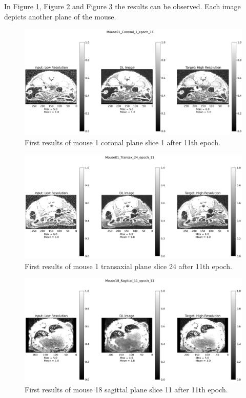 \documentclass[twocolumn]{article}
\begin{document}
In Figure \ref{fig:coronal_first}, Figure \ref{fig:transax_first} and Figure \ref{fig:sagittal_first} the results can be observed. 
Each image depicts another plane of the mouse.

\begin{figure}
    \centering
    \includegraphics[width=1\linewidth]{Mouse01_Coronal_1_epoch_11.png}
    \caption{First results of mouse 1 coronal plane slice 1 after 11th epoch.}
    \label{fig:coronal_first}
\end{figure}

\begin{figure}
    \centering
    \includegraphics[width=1\linewidth]{Mouse01_Transax_24_epoch_11.png}
    \caption{First results of mouse 1 transaxial plane slice 24 after 11th epoch.}
    \label{fig:transax_first}
\end{figure}

\begin{figure}
    \centering
    \includegraphics[width=1\linewidth]{Mouse18_Sagittal_11_epoch_11.png}
    \caption{First results of mouse 18 sagittal plane slice 11 after 11th epoch.}
    \label{fig:sagittal_first}
\end{figure}
\end{document}
